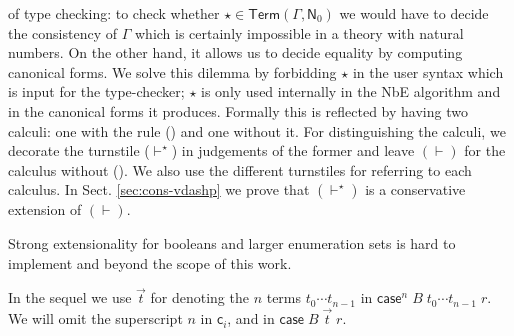 \documentclass{LMCS}
\theoremstyle{plain}\newtheorem{satz}[thm]{Satz}
\newcommand{\term}[2]{\mathsf{Term}(#1,#2)}
\newcommand{\vdashp}{\vdash^{\oprf}}\newcommand{\sdctx}[1]{#1\vdashp}
\newcommand{\ruleref}[1]{(\RefTirName{#1})}
\newcommand{\oprf}{\dprf}
\newcommand{\dprf}{\star}
\newcommand{\elimraw}{\mathsf{case}}
\newcommand{\enum}[1]{\mathsf{N}_{#1}}
\newcommand{\elim}[4]{\elimraw\!^{#1}\;#2\;#3\;#4}
\newcommand{\elimn}[3]{\elimraw\;#1\;#2\;#3}
\newcommand{\constn}[1]{\mathsf{c}_{#1}}
\newcommand{\enumrule}[2][n]{n\ensuremath{_{#1}}-{#2}}
\begin{document}
of type checking: to check whether $\oprf \in \term \Gamma {\enum 0}$
we would have to decide the consistency of $\Gamma$ which is certainly
impossible in a theory with natural numbers.  On the other hand, it
allows us to decide equality by computing canonical forms.  We solve
this dilemma by forbidding $\oprf$ in the user syntax which is input
for the type-checker; $\oprf$ is only used internally in the NbE
algorithm and in the canonical forms it produces. Formally this is
reflected by having two calculi: one with the rule
\ruleref{\enumrule[0]tm} and one without it. For distinguishing the
calculi, we decorate the turnstile ($\vdashp$) in judgements of the
former and leave $(\vdash)$ for the calculus without
\ruleref{\enumrule[0]tm}. We also use the different turnstiles for
referring to each calculus. In Sect. \ref{sec:cons-vdashp} we prove
that $(\vdashp)$ is a conservative extension of $(\vdash)$.


Strong extensionality for booleans and larger enumeration sets is hard
to implement
\cite{altenkirchDybjerHofmannScott:lics01,balatDiCosmoFiore:popl04} 
and beyond the scope of this work.

In the sequel we use $\vec{t}$ for denoting the $n$ terms
$t_0 \cdots t_{n-1}$ in $\elim{n}{B}{t_0\cdots t_{n-1}}{r}$. We will
omit the superscript $n$ in $\constn{i}$, and in $\elimn{B}{\vec{t}}{r}$.
\end{document}
